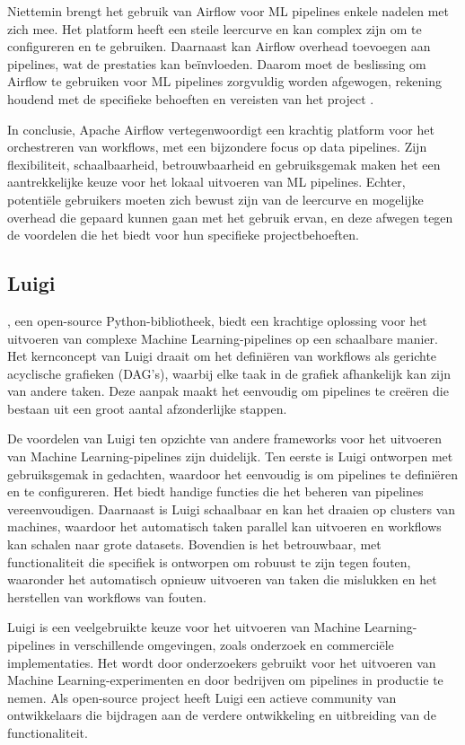 Niettemin brengt het gebruik van Airflow voor ML pipelines enkele nadelen met zich mee. Het platform heeft een steile leercurve en kan complex zijn om te configureren en te gebruiken. Daarnaast kan Airflow overhead toevoegen aan pipelines, wat de prestaties kan beïnvloeden. Daarom moet de beslissing om Airflow te gebruiken voor ML pipelines zorgvuldig worden afgewogen, rekening houdend met de specifieke behoeften en vereisten van het project \autocite{Harenslak2021}.

In conclusie, Apache Airflow vertegenwoordigt een krachtig platform voor het orchestreren van workflows, met een bijzondere focus op data pipelines. Zijn flexibiliteit, schaalbaarheid, betrouwbaarheid en gebruiksgemak maken het een aantrekkelijke keuze voor het lokaal uitvoeren van ML pipelines. Echter, potentiële gebruikers moeten zich bewust zijn van de leercurve en mogelijke overhead die gepaard kunnen gaan met het gebruik ervan, en deze afwegen tegen de voordelen die het biedt voor hun specifieke projectbehoeften.

\subsection{Luigi}

\textcite{Luigi2024}, een open-source Python-bibliotheek, biedt een krachtige oplossing voor het uitvoeren van complexe Machine Learning-pipelines op een schaalbare manier. Het kernconcept van Luigi draait om het definiëren van workflows als gerichte acyclische grafieken (DAG's), waarbij elke taak in de grafiek afhankelijk kan zijn van andere taken. Deze aanpak maakt het eenvoudig om pipelines te creëren die bestaan uit een groot aantal afzonderlijke stappen.

De voordelen van Luigi ten opzichte van andere frameworks voor het uitvoeren van Machine Learning-pipelines zijn duidelijk. Ten eerste is Luigi ontworpen met gebruiksgemak in gedachten, waardoor het eenvoudig is om pipelines te definiëren en te configureren. Het biedt handige functies die het beheren van pipelines vereenvoudigen. Daarnaast is Luigi schaalbaar en kan het draaien op clusters van machines, waardoor het automatisch taken parallel kan uitvoeren en workflows kan schalen naar grote datasets. Bovendien is het betrouwbaar, met functionaliteit die specifiek is ontworpen om robuust te zijn tegen fouten, waaronder het automatisch opnieuw uitvoeren van taken die mislukken en het herstellen van workflows van fouten.

Luigi is een veelgebruikte keuze voor het uitvoeren van Machine Learning-pipelines in verschillende omgevingen, zoals onderzoek en commerciële implementaties. Het wordt door onderzoekers gebruikt voor het uitvoeren van Machine Learning-experimenten en door bedrijven om pipelines in productie te nemen. Als open-source project heeft Luigi een actieve community van ontwikkelaars die bijdragen aan de verdere ontwikkeling en uitbreiding van de functionaliteit.

